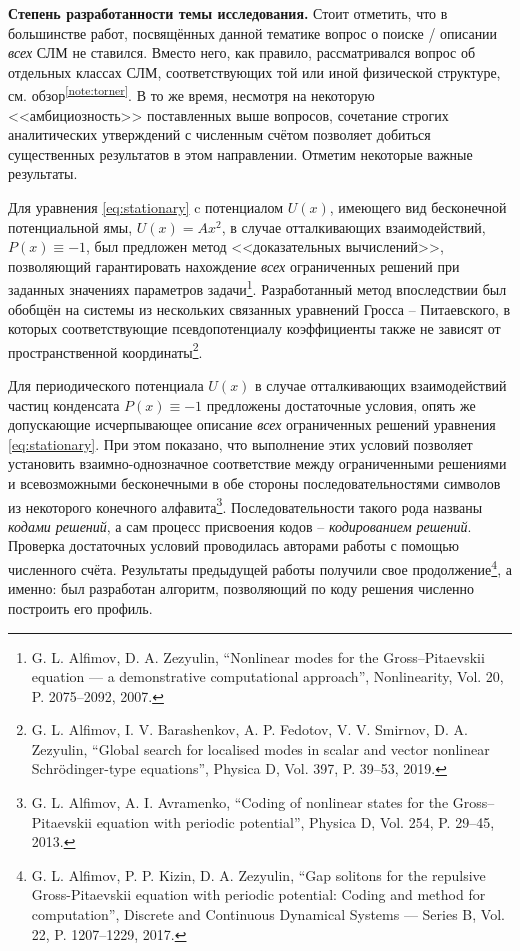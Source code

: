 \documentclass[candidate, href, colorlinks]{disser}
\begin{document}
\textbf{Степень разработанности темы исследования.}
Стоит отметить, что в большинстве работ, посвящённых данной тематике вопрос о поиске / описании {\it всех} СЛМ не ставился.
Вместо него, как правило, рассматривался вопрос об отдельных классах СЛМ, соответствующих той или иной физической структуре, см. обзор\textsuperscript{\ref{note:torner}}.
В то же время, несмотря на некоторую <<амбициозность>> поставленных выше вопросов, сочетание строгих аналитических утверждений с численным счётом позволяет добиться существенных результатов в этом направлении. 
Отметим некоторые важные результаты.

Для уравнения \eqref{eq:stationary} c потенциалом $U(x)$, имеющего вид бесконечной потенциальной ямы, $U(x) = A x^2$, в случае отталкивающих взаимодействий, $P(x) \equiv -1$, был предложен метод <<доказательных вычислений>>, позволяющий гарантировать нахождение {\it всех} ограниченных решений при заданных значениях параметров задачи\footnote{\label{note:alfzez} G. L. Alfimov, D. A. Zezyulin, ``Nonlinear modes for the Gross--Pitaevskii equation --- a demonstrative computational approach'', Nonlinearity, Vol. 20, P. 2075--2092, 2007.}.
Разработанный метод впоследствии был обобщён на системы из нескольких связанных уравнений Гросса -- Питаевского, в которых соответствующие псевдопотенциалу коэффициенты также не зависят от пространственной координаты\footnote{G. L. Alfimov, I. V. Barashenkov, A. P. Fedotov, V. V. Smirnov, D. A. Zezyulin, ``Global search for localised modes in scalar and vector nonlinear Schr{\"o}dinger-type equations'', Physica D, Vol. 397, P. 39--53, 2019.}.

Для периодического потенциала $U(x)$ в случае отталкивающих взаимодействий частиц конденсата $P(x) \equiv -1$ предложены достаточные условия, опять же допускающие исчерпывающее описание {\it всех} ограниченных решений уравнения \eqref{eq:stationary}.
При этом показано, что выполнение этих условий позволяет установить взаимно-однозначное соответствие между ограниченными решениями и всевозможными бесконечными в обе стороны последовательностями символов из некоторого конечного алфавита\footnote{\label{note:alfavr} G. L. Alfimov, A. I. Avramenko, ``Coding of nonlinear states for the Gross--Pitaevskii equation with periodic potential'', Physica D, Vol. 254, P. 29--45, 2013.}.
Последовательности такого рода названы {\it кодами решений}, а сам процесс присвоения кодов -- {\it кодированием решений}.
Проверка достаточных условий проводилась авторами работы с помощью численного счёта.
Результаты предыдущей работы получили свое продолжение\footnote{G. L. Alfimov, P. P. Kizin, D. A. Zezyulin, ``Gap solitons for the repulsive Gross-Pitaevskii equation with periodic potential: Coding and method for computation'', Discrete and Continuous Dynamical Systems --- Series B, Vol. 22, P. 1207--1229, 2017.}, а именно: был разработан алгоритм, позволяющий по коду решения численно построить его профиль.
\end{document}
